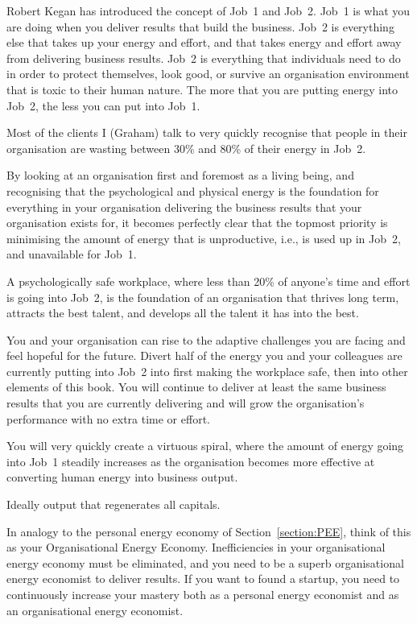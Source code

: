 Robert Kegan\cite{kegan-everyone} has introduced the concept of Job~1 and Job~2. Job~1 is what you are doing when you deliver results that build the business. Job~2 is everything else that takes up your energy and effort, and that takes energy and effort away from delivering business results. Job~2 is everything that individuals need to do in order to protect themselves, look good, or survive an organisation environment that is toxic to their human nature. The more that you are putting energy into Job~2, the less you can put into Job~1.


Most of the clients I (Graham) talk to very quickly recognise that people in their organisation are wasting between 30\% and 80\% of their energy in Job~2.


By looking at an organisation first and foremost as a living being, and recognising that the psychological and physical energy is the foundation for everything in your organisation delivering the business results that your organisation exists for, it becomes perfectly clear that the topmost priority is minimising the amount of energy that is unproductive, i.e., is used up in Job~2, and unavailable for Job~1. 


A psychologically safe workplace, where less than 20\% of anyone's time and effort is going into Job~2, is the foundation of an organisation that thrives long term, attracts the best talent, and develops all the talent it has into the best.


You and your organisation can rise to the adaptive challenges you are facing and feel hopeful for the future. Divert half of the energy you and your colleagues are currently putting into Job~2 into first making the workplace safe, then into other elements of this book. You will continue to deliver at least the same business results that you are currently delivering and will grow the organisation’s performance with no extra time or effort.


You will very quickly create a virtuous spiral, where the amount of energy going into Job~1 steadily increases as the organisation becomes more effective at converting human energy into business output. 


Ideally output that regenerates all capitals.


In analogy to the personal energy economy of Section~\ref{section:PEE}, think of this as your Organisational Energy Economy. Inefficiencies in your organisational energy economy must be eliminated, and you need to be a superb organisational energy economist to deliver results. If you want to found a startup, you need to continuously increase your mastery both as a personal energy economist and as an organisational energy economist.


